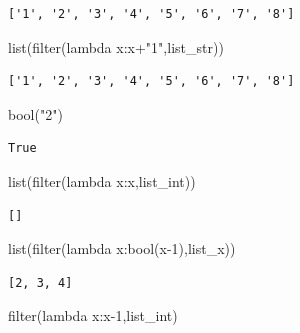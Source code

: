 \documentclass[
  letterpaper,
  DIV=11,
  numbers=noendperiod]{scrreprt}
\newenvironment{Shaded}{\begin{snugshade}}{\end{snugshade}}
\newcommand{\BuiltInTok}[1]{\textcolor[rgb]{0.00,0.23,0.31}{#1}}
\newcommand{\DecValTok}[1]{\textcolor[rgb]{0.68,0.00,0.00}{#1}}
\newcommand{\KeywordTok}[1]{\textcolor[rgb]{0.00,0.23,0.31}{#1}}
\newcommand{\NormalTok}[1]{\textcolor[rgb]{0.00,0.23,0.31}{#1}}
\newcommand{\OperatorTok}[1]{\textcolor[rgb]{0.37,0.37,0.37}{#1}}
\newcommand{\StringTok}[1]{\textcolor[rgb]{0.13,0.47,0.30}{#1}}
\begin{document}
\begin{verbatim}
['1', '2', '3', '4', '5', '6', '7', '8']
\end{verbatim}

\begin{Shaded}
\begin{Highlighting}[]
\BuiltInTok{list}\NormalTok{(}\BuiltInTok{filter}\NormalTok{(}\KeywordTok{lambda}\NormalTok{ x:x}\OperatorTok{+}\StringTok{"1"}\NormalTok{,list\_str))}
\end{Highlighting}
\end{Shaded}

\begin{verbatim}
['1', '2', '3', '4', '5', '6', '7', '8']
\end{verbatim}

\begin{Shaded}
\begin{Highlighting}[]
\BuiltInTok{bool}\NormalTok{(}\StringTok{"2"}\NormalTok{)}
\end{Highlighting}
\end{Shaded}

\begin{verbatim}
True
\end{verbatim}

\begin{Shaded}
\begin{Highlighting}[]
\BuiltInTok{list}\NormalTok{(}\BuiltInTok{filter}\NormalTok{(}\KeywordTok{lambda}\NormalTok{ x:x,list\_int))}
\end{Highlighting}
\end{Shaded}

\begin{verbatim}
[]
\end{verbatim}

\begin{Shaded}
\begin{Highlighting}[]
\BuiltInTok{list}\NormalTok{(}\BuiltInTok{filter}\NormalTok{(}\KeywordTok{lambda}\NormalTok{ x:}\BuiltInTok{bool}\NormalTok{(x}\OperatorTok{{-}}\DecValTok{1}\NormalTok{),list\_x))}
\end{Highlighting}
\end{Shaded}

\begin{verbatim}
[2, 3, 4]
\end{verbatim}

\begin{Shaded}
\begin{Highlighting}[]
\BuiltInTok{filter}\NormalTok{(}\KeywordTok{lambda}\NormalTok{ x:x}\OperatorTok{{-}}\DecValTok{1}\NormalTok{,list\_int)}
\end{Highlighting}
\end{Shaded}
\end{document}
